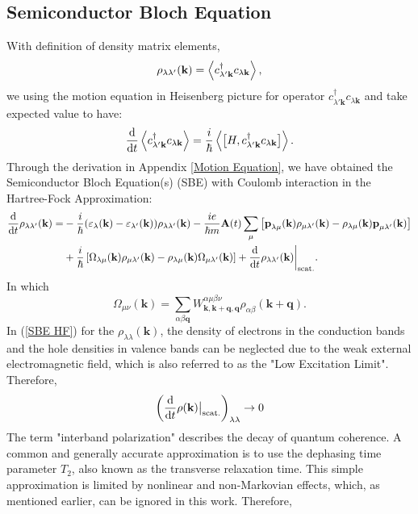 \documentclass[12pt,english,a4paper]{article}
\newcommand{\dg}{\dagger}
\begin{document}
	\subsection{Semiconductor Bloch Equation}
	\quad With definition of density matrix elements,
	\begin{equation}
		\rho_{\lambda \lambda'}(\textbf{k}) = \ev{c^\dg_{\lambda'\textbf{k}} c_{\lambda\textbf{k}}},
	\end{equation}
	\quad we using the motion equation in Heisenberg picture for operator $c^\dg_{\lambda'\textbf{k}} c_{\lambda\textbf{k}}$ and take expected value to have:
	\begin{equation}
		\label{Heisenberg eq}
		\dv{}{t}\ev{c^\dg_{\lambda'\textbf{k}} c_{\lambda\textbf{k}}} = \frac{i}{\hbar}\ev{\big[H,c^\dg_{\lambda'\textbf{k}} c_{\lambda\textbf{k}} \big]}.
	\end{equation}
\quad Through the derivation in Appendix \ref{Motion Equation}, we have obtained the Semiconductor Bloch Equation(s) (SBE) with Coulomb interaction in the Hartree-Fock Approximation:
\begin{align}
	\label{SBE HF}
\dv{ }{t}\rho_{\lambda\lambda'}(\textbf{k}) =& - \frac{i}{\hbar} (\varepsilon_\lambda(\textbf{k}) - \varepsilon_{\lambda'} (\textbf{k}))\rho_{\lambda \lambda'}(\textbf{k}) - \frac{ie}{\hbar m} \textbf{A}(t)\sum_{\mu}\left[\textbf{p}_{\lambda\mu}(\textbf{k})\rho_{\mu \lambda'}(\textbf{k}) - \rho_{\lambda\mu}(\textbf{k})\textbf{p}_{\mu \lambda'}(\textbf{k})\right] \nonumber \\
&+ \frac{i}{\hbar}\left[\Omega_{\lambda \mu}(\textbf{k})\rho_{\mu \lambda'}(\textbf{k}) - \rho_{\lambda\mu}(\textbf{k}) \Omega_{\mu \lambda'} (\textbf{k})\right] +\dv{ }{t}\rho_{\lambda\lambda'}(\textbf{k})\bigg|_{\mathrm{scat.}}.
\end{align}
\quad In which
\begin{equation}
\Omega_{\mu\nu} (\textbf{k})=\sum_{\alpha \beta \textbf{q}} W^{\alpha \mu \beta \nu}_{\textbf{k},\textbf{k}+\textbf{q},\textbf{q}} \rho_{\alpha\beta} (\textbf{k}+\textbf{q}).
\end{equation}
\quad In (\ref{SBE HF}) for the $\rho_{\lambda \lambda}(\textbf{k})$, the density of electrons in the conduction bands and the hole densities in valence bands can be neglected due to the weak external electromagnetic field, which is also referred to as the "Low Excitation Limit". Therefore,\\
$$\biggl(\dv{}{t} \rho(\textbf{k})\big|_\mathrm{scat.}\biggr)_{\lambda\lambda} \to 0$$ 
\quad The term "interband polarization" describes the decay of quantum coherence. A common and generally accurate approximation is to use the dephasing time parameter $T_2$, also known as the transverse relaxation time. This simple approximation is limited by nonlinear and non-Markovian effects, which, as mentioned earlier, can be ignored in this work. Therefore,
\end{document}
